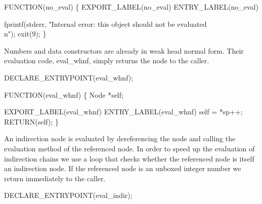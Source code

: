 \nwendcode{}\nwdocspar
\nwenddocs{}\plusendmoddef\nwstartdeflinemarkup{}\nwenddeflinemarkup
FUNCTION(no_eval)
\{
    EXPORT_LABEL(no_eval)
 ENTRY_LABEL(no_eval)

    fprintf(stderr, "Internal error: this object should not be evaluated\\n");
    exit(9);
\}

\nwendcode{}\nwdocspar
Numbers and data constructors are already in weak head normal form.
Their evaluation code, {\Tt{}eval{\_}whnf\nwendquote}, simply returns the node to the
caller.

\nwenddocs{}\plusendmoddef\nwstartdeflinemarkup{}\nwenddeflinemarkup
DECLARE_ENTRYPOINT(eval_whnf);

\nwendcode{}\nwdocspar
\nwenddocs{}\plusendmoddef\nwstartdeflinemarkup{}\nwenddeflinemarkup
FUNCTION(eval_whnf)
\{
    Node *self;

    EXPORT_LABEL(eval_whnf)
 ENTRY_LABEL(eval_whnf)
    self = *sp++;
    RETURN(self);
\}

\nwendcode{}\nwdocspar
An indirection node is evaluated by dereferencing the node and calling
the evaluation method of the referenced node. In order to speed up the
evaluation of indirection chains we use a loop that checks whether the
referenced node is itself an indirection node.  If the referenced node
is an unboxed integer number we return immediately to the caller.

\nwenddocs{}\plusendmoddef\nwstartdeflinemarkup{}\nwenddeflinemarkup
DECLARE_ENTRYPOINT(eval_indir);

